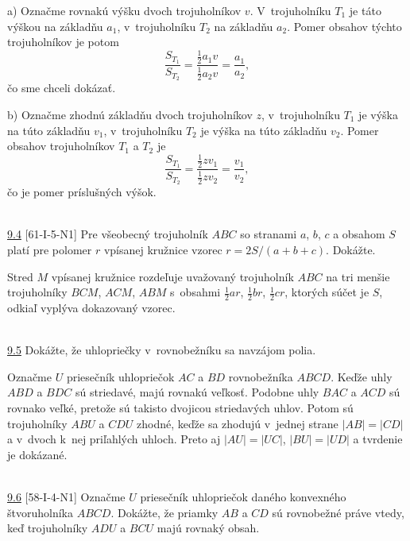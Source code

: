 \rie a) Označme rovnakú výšku dvoch trojuholníkov $v$. V~trojuholníku $T_1$ je táto výškou na základňu $a_1$, v~trojuholníku $T_2$ na základňu $a_2$. Pomer obsahov týchto trojuholníkov je potom $$\frac{S_{T_1}}{S_{T_2}}=\frac{\frac{1}{2}a_1v}{\frac{1}{2}a_2v}=\frac{a_1}{a_2},$$ čo sme chceli dokázať.

b) Označme zhodnú základňu dvoch trojuholníkov $z$, v~trojuholníku $T_1$ je výška na túto základňu $v_1$, v~trojuholníku $T_2$ je výška na túto základňu $v_2$. Pomer obsahov trojuholníkov $T_1$ a $T_2$ je
$$\frac{S_{T_1}}{S_{T_2}}=\frac{\frac{1}{2}zv_1}{\frac{1}{2}zv_2}=\frac{v_1}{v_2},$$
čo je pomer príslušných výšok.\\
\\
\begin{tcolorbox}[breakable,notitle,boxrule=0pt,colback=light-gray,colframe=light-gray]\ul{9.4} [61-I-5-N1]  Pre všeobecný trojuholník $ABC$ so stranami $a$, $b$, $c$ a obsahom $S$ platí pre polomer $r$ vpísanej kružnice vzorec $r = 2S/(a + b + c)$. Dokážte.

\end{tcolorbox}

\rieh Stred $M$ vpísanej kružnice rozdeľuje uvažovaný trojuholník $ABC$ na tri menšie trojuholníky $BCM$, $ACM$, $ABM$ s~obsahmi $\frac{1}{2}ar$, $\frac{1}{2}br$, $\frac{1}{2}cr$, ktorých súčet je $S$, odkiaľ vyplýva dokazovaný vzorec.\\
\\
\begin{tcolorbox}[breakable,notitle,boxrule=0pt,colback=light-gray,colframe=light-gray]\ul{9.5} Dokážte, že uhlopriečky v~rovnobežníku sa navzájom polia.

\end{tcolorbox}

\rie Označme $U$ priesečník uhlopriečok $AC$ a $BD$ rovnobežníka $ABCD$. Keďže uhly $ABD$ a $BDC$ sú striedavé, majú rovnakú veľkosť. Podobne uhly $BAC$ a $ACD$ sú rovnako veľké, pretože sú takisto dvojicou striedavých uhlov. Potom sú trojuholníky $ABU$ a $CDU$ zhodné, keďže sa zhodujú v~jednej strane $|AB|=|CD|$ a v~dvoch k~nej priľahlých uhloch. Preto aj $|AU|=|UC|$, $|BU|=|UD|$ a tvrdenie je dokázané.\\
\\
\begin{tcolorbox}[breakable,notitle,boxrule=0pt,colback=light-gray,colframe=light-gray]\ul{9.6} [58-I-4-N1]  Označme $U$ priesečník uhlopriečok daného konvexného štvoruholníka $ABCD$. Dokážte, že priamky $AB$ a $CD$ sú rovnobežné práve vtedy, keď trojuholníky $ADU$ a $BCU$ majú rovnaký obsah.

\end{tcolorbox}

